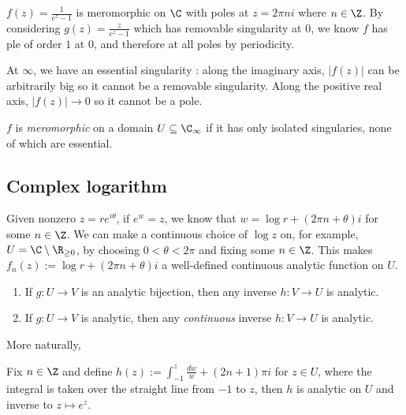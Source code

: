 \documentclass[a4paper]{article}
\begin{document}
\begin{eg}
  \(f(z) = \frac{1}{e^z - 1}\) is meromorphic on \(\C\) with poles at \(z = 2\pi n i\) where \(n \in \Z\). By considering \(g(z) = \frac{z}{e^z - 1}\) which has removable singularity at \(0\), we know \(f\) has ple of order \(1\) at \(0\), and therefore at all poles by periodicity.

  At \(\infty\), we have an essential singularity : along the imaginary axis, \(|f(z)|\) can be arbitrarily big so it cannot be a removable singularity. Along the positive real axis, \(|f(z)| \to 0\) so it cannot be a pole.
\end{eg}

\begin{definition}
  \(f\) is \emph{meromorphic} on a domain \(U \subseteq \C_\infty\)  if it has only isolated singularies, none of which are essential.
\end{definition}

\subsection{Complex logarithm}

Given nonzero \(z = r e^{i \theta}\), if \(e^w = z\), we know that \(w = \log r + (2\pi n + \theta) i\) for some \(n \in \Z\). We can make a continuous choice of \(\log z\) on, for example, \(U = \C \setminus \R_{\geq 0}\), by choosing \(0 < \theta < 2\pi\) and fixing some \(n \in \Z\). This makes \(f_n(z) := \log r + (2\pi n + \theta)i\) a well-defined continuous analytic function on \(U\).

\begin{note}\leavevmode
  \begin{enumerate}
  \item If \(g: U \to V\) is an analytic bijection, then any inverse \(h: V \to U\) is analytic.
  \item If \(g: U \to V\) is analytic, then any \emph{continuous} inverse \(h: V \to U\) is analytic.
  \end{enumerate}
\end{note}

More naturally,

\begin{proposition}
  Fix \(n \in \Z\) and define \(h(z) := \int_{-1}^z \frac{dw}{w} + (2n + 1)\pi i\) for \(z \in U\), where the integral is taken over the straight line from \(-1\) to \(z\), then \(h\) is analytic on \(U\) and inverse to \(z \mapsto e^z\).
\end{proposition}
\end{document}
